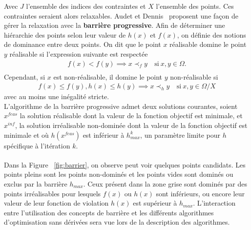 Avec $J$ l'ensemble des indices des contraintes et $X$ l'ensemble des points. Ces contraintes seraient alors relaxables. Audet et Dennis~\cite{AuDe09a} proposent une façon de gérer la relaxation avec la \textbf{barrière progressive}. Afin de déterminer une hiérarchie des points selon leur valeur de $h(x)$ et $f(x)$, on définie des notions de dominance entre deux points. On dit que le point $x$ réalisable domine le point $y$ réalisable si l'expression suivante est respectée 
\begin{align*}
f(x) < f(y) \implies x\prec_{f} y ~ &\text{si}~x,y\in\Omega.\\
\end{align*}
Cependant, si $x$ est non-réalisable, il domine le point $y$ non-réalisable si
\begin{align*}
f(x) \leq f(y), h(x)\leq h(y) \implies x\prec_{h} y ~ &\text{si}~x,y\in\Omega/X
\end{align*}
avec au moins une inégalité stricte.\\
L'algorithme de la barrière progressive admet deux solutions courantes, soient $x^{feas}$ la solution réalisable dont la valeur de la fonction objectif est minimale, et $x^{inf}$, la solution irréalisable non-dominée dont la valeur de la fonction objectif est minimale et où $h(x^{feas})$ est inférieur à $h^k_{max}$, un paramètre limite pour $h$ spécifique à l'itération $k$.\\
\\
Dans la Figure ~\ref{fig:barrier}, on observe peut voir quelques points candidats. Les points pleins sont les points non-dominés et les points vides sont dominés ou exclus par la barrière $h_{max}$. Ceux présent dans la zone grise sont dominés par des points irréalisables pour lesquels $f(x)$ ou $h(x)$ sont inférieurs,  ou encore leur valeur de leur fonction de violation $h(x)$ est supérieur à $h_{max}$. L'interaction entre l'utilisation des concepts de barrière et les différents algorithmes d'optimisation sans dérivées sera vue lors de la description des algorithmes.
